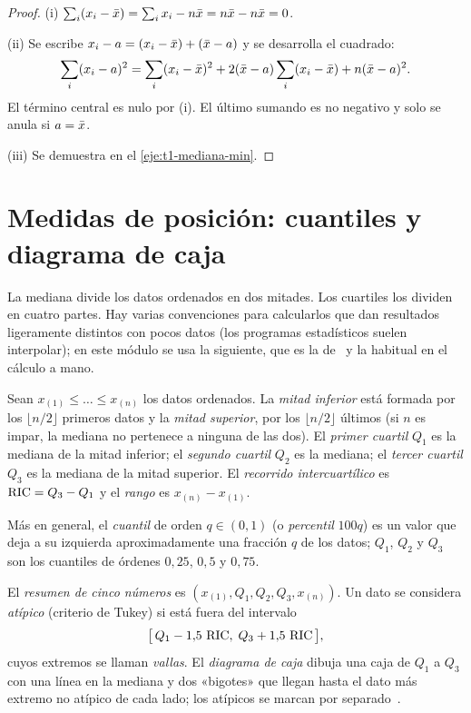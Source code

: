 \begin{proof}
(i) $\sum_i(x_i-\bar{x})=\sum_i x_i-n\bar{x}=n\bar{x}-n\bar{x}=0$.

(ii) Se escribe $x_i-a=(x_i-\bar{x})+(\bar{x}-a)$ y se desarrolla el cuadrado:
\[
\sum_i(x_i-a)^{2}=\sum_i(x_i-\bar{x})^{2}+2(\bar{x}-a)\sum_i(x_i-\bar{x})+n(\bar{x}-a)^{2}.
\]
El término central es nulo por (i). El último sumando es no negativo y solo se anula si $a=\bar{x}$.

(iii) Se demuestra en el \cref{eje:t1-mediana-min}.
\end{proof}

\section{Medidas de posición: cuantiles y diagrama de caja}

La mediana divide los datos ordenados en dos mitades. Los cuartiles los dividen en cuatro partes. Hay varias convenciones para calcularlos que dan resultados ligeramente distintos con pocos datos (los programas estadísticos suelen interpolar); en este módulo se usa la siguiente, que es la de~\cite[§2.3]{openstax} y la habitual en el cálculo a mano.

\begin{definicion}\label{def:t1-cuartiles}
Sean $x_{(1)}\le\dots\le x_{(n)}$ los datos ordenados. La \emph{mitad inferior} está formada por los $\lfloor n/2\rfloor$ primeros datos y la \emph{mitad superior}, por los $\lfloor n/2\rfloor$ últimos (si $n$ es impar, la mediana no pertenece a ninguna de las dos). El \emph{primer cuartil} $Q_1$ es la mediana de la mitad inferior; el \emph{segundo cuartil} $Q_2$ es la mediana; el \emph{tercer cuartil} $Q_3$ es la mediana de la mitad superior. El \emph{recorrido intercuartílico} es $\operatorname{RIC}=Q_3-Q_1$ y el \emph{rango} es $x_{(n)}-x_{(1)}$.
\end{definicion}

Más en general, el \emph{cuantil} de orden $q\in(0,1)$ (o \emph{percentil} $100q$) es un valor que deja a su izquierda aproximadamente una fracción $q$ de los datos; $Q_1$, $Q_2$ y $Q_3$ son los cuantiles de órdenes $0{,}25$, $0{,}5$ y $0{,}75$.

\begin{definicion}\label{def:t1-caja}
El \emph{resumen de cinco números} es $(x_{(1)},Q_1,Q_2,Q_3,x_{(n)})$. Un dato se considera \emph{atípico} (criterio de Tukey) si está fuera del intervalo
\[
\bigl[\,Q_1-1{,}5\,\operatorname{RIC},\;Q_3+1{,}5\,\operatorname{RIC}\,\bigr],
\]
cuyos extremos se llaman \emph{vallas}. El \emph{diagrama de caja} dibuja una caja de $Q_1$ a $Q_3$ con una línea en la mediana y dos «bigotes» que llegan hasta el dato más extremo no atípico de cada lado; los atípicos se marcan por separado~\cite[§2.4]{openstax}.
\end{definicion}

